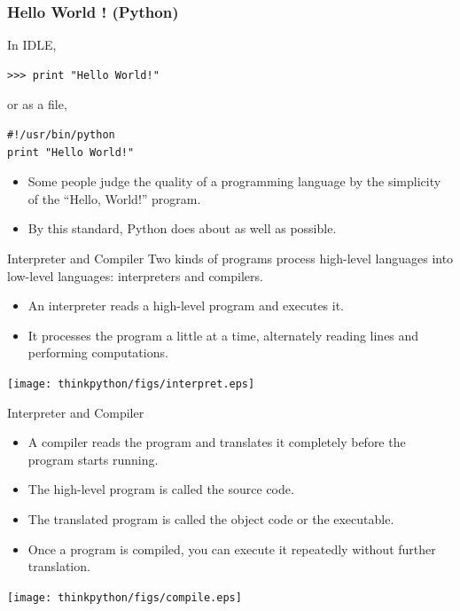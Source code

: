 \documentclass{beamer}
\begin{document}
\begin{frame}[fragile]
\frametitle{ Hello World ! (Python) }
In IDLE,
\begin{verbatim}
>>> print "Hello World!"
\end{verbatim}
\vspace*{0.1in}
or as a file, 
\begin{verbatim}
#!/usr/bin/python
print "Hello World!"
\end{verbatim}
\begin{itemize}
\item Some people judge the quality of a programming language by the simplicity of the ``Hello, World!'' program. 
\item By this standard, Python does about as well as possible.
\end{itemize}
\end{frame}
\begin{frame}{Interpreter and Compiler}
Two kinds of programs process high-level languages into low-level languages: \alert{interpreters and compilers}.
\begin{itemize}[<+->]
\item An interpreter reads a high-level program and executes it.
\item It processes the program a little at a time, alternately reading lines and performing computations.
\end{itemize}
\vspace*{0.2in}
\centerline{\texttt{[image: thinkpython/figs/interpret.eps]}}
\end{frame}

\begin{frame}{Interpreter and Compiler}
\begin{itemize}[<+->]
\item A compiler reads the program and translates it completely before the program starts running. 
\item The high-level program is called the \alert{source code}.
\item The translated program is called the \alert{object code} or the \alert{executable}. 
\item Once a program is compiled, you can execute it repeatedly without further translation.
\end{itemize}
\vspace*{0.2in}
\centerline{\texttt{[image: thinkpython/figs/compile.eps]}}

\end{frame}
\end{document}
